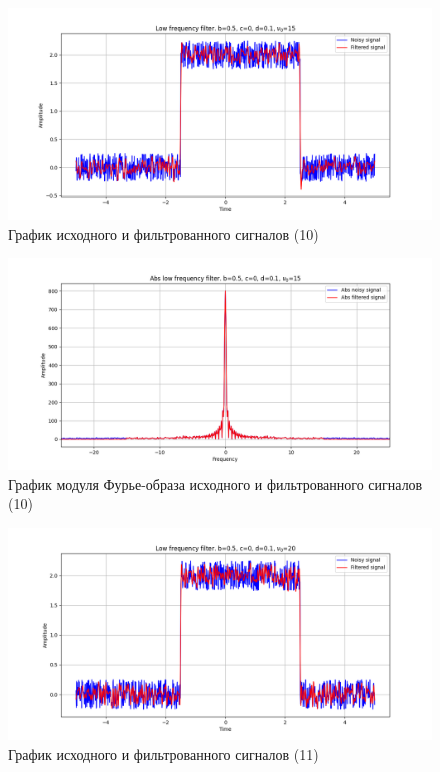 \documentclass[a4paper, 12pt]{article}
\begin{document}
    \begin{figure}[!htb]
        \centering
        \includegraphics[scale=0.48]{7_u_flt_u_nohigh.png}
        \captionsetup{skip=0pt}
        \caption{График исходного и фильтрованного сигналов (10)}
        \label{fig:fig19}
    \end{figure}
    \begin{figure}[!htb]
        \centering
        \includegraphics[scale=0.48]{7_abs_u_U_nohigh.png}
        \captionsetup{skip=0pt}
        \caption{График модуля Фурье-образа исходного и фильтрованного сигналов (10)}
        \label{fig:fig20}
    \end{figure}
    \begin{figure}[!htb]
        \centering
        \includegraphics[scale=0.48]{6_u_flt_u_nohigh.png}
        \captionsetup{skip=0pt}
        \caption{График исходного и фильтрованного сигналов (11)}
        \label{fig:fig21}
    \end{figure}
\end{document}
